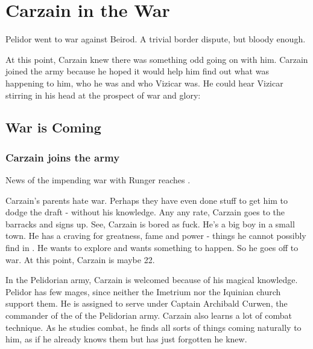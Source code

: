 \section{Carzain in the War}
Pelidor went to war against Beirod. 
A trivial border dispute, but bloody enough. 

At this point, Carzain knew there was something odd going on with him. 
Carzain joined the army because he hoped it would help him find out what was happening to him, who he was and who Vizicar was. 
He could hear Vizicar stirring in his head at the prospect of war and glory: 

\begin{prose}
\end{prose}







\subsection{War is Coming}







\subsubsection{Carzain joins the army}
News of the impending war with Runger reaches \Redglen. 

Carzain's parents hate war. Perhaps they have even done stuff to get him to dodge the draft - without his knowledge. Any any rate, Carzain goes to the barracks and signs up. See, Carzain is bored as fuck. He's a big boy in a small town. He has a craving for greatness, fame and power - things he cannot possibly find in \Redglen. He wants to explore and wants something to happen. So he goes off to war. At this point, Carzain is maybe 22. 

In the Pelidorian army, Carzain is welcomed because of his magical knowledge. Pelidor has few mages, since neither the Imetrium nor the Iquinian church support them. He is assigned to serve under Captain Archibald Curwen, the commander of the \ishrah of the Pelidorian army.  
Carzain also learns a lot of combat technique. As he studies combat, he finds all sorts of things coming naturally to him, as if he already knows them but has just forgotten he knew. 

